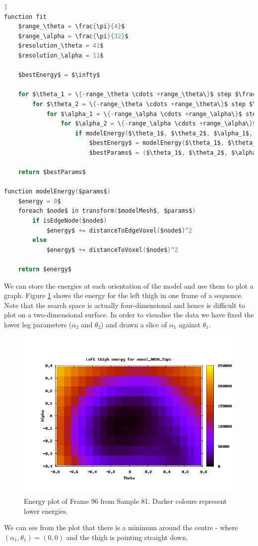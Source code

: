 \begin{lstlisting}[firstnumber=1,language=c,morekeywords={step,function,foreach,in},frame=single,mathescape=true,caption={Least squares fitting pseudo-code},label={leastsquarescode},float=[tb]]
function fit
	$range_\theta = \frac{\pi}{4}$
	$range_\alpha = \frac{\pi}{32}$
	$resolution_\theta = 41$
	$resolution_\alpha = 11$
	
	$bestEnergy$ = $\infty$
	
	for $\theta_1 = \{-range_\theta \cdots +range_\theta\}$ step $\frac{2range_\theta}{resolution_\theta}$
		for $\theta_2 = \{-range_\theta \cdots +range_\theta\}$ step $\frac{2range_\theta}{resolution_\theta}$
			for $\alpha_1 = \{-range_\alpha \cdots +range_\alpha\}$ step $\frac{2range_\alpha}{resolution_\alpha}$
				for $\alpha_2 = \{-range_\alpha \cdots +range_\alpha\}$ step $\frac{2range_\alpha}{resolution_\alpha}$
					if modelEnergy($\theta_1$, $\theta_2$, $\alpha_1$, $\alpha_2$) < $bestEnergy$
						$bestEnergy$ = modelEnergy($\theta_1$, $\theta_2$, $\alpha_1$, $\alpha_2$)
						$bestParams$ = ($\theta_1$, $\theta_2$, $\alpha_1$, $\alpha_2$)
	
	return $bestParams$

function modelEnergy($params$)
	$energy = 0$
	foreach $node$ in transform($modelMesh$, $params$)
		if isEdgeNode($node$)
			$energy$ += distanceToEdgeVoxel($node$)^2
		else
			$energy$ += distanceToVoxel($node$)^2
	
	return $energy$
\end{lstlisting}

We can store the energies at each orientation of the model and use them to plot a graph.
Figure \ref{EnergyPlot} shows the energy for the left thigh in one frame of a sequence.
Note that the search space is actually four-dimensional and hence is difficult to plot on a two-dimensional surface.
In order to visualise the data we have fixed the lower leg parameters ($\alpha_2$ and $\theta_2$) and drawn a slice of $\alpha_1$ against $\theta_1$.

\begin{figure}[tb]
	\centering
	\includegraphics[width=\textwidth]{problems/set81frame96-fixed-leftthigh.png}
	\caption{Energy plot of Frame 96 from Sample 81.
		Darker colours represent lower energies.}
	\label{EnergyPlot}
\end{figure}

We can see from the plot that there is a minimum around the centre - where $(\alpha_1, \theta_1) = (0, 0)$ and the thigh is pointing straight down.

